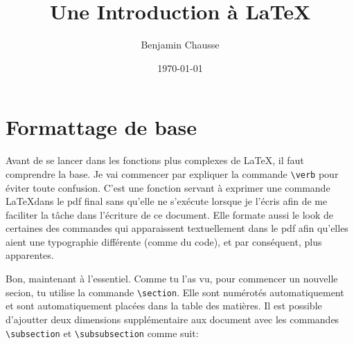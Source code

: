\documentclass[a4paper, 10pt]{article}
\title{Une Introduction à \LaTeX}
\author{Benjamin Chausse}
\date{\today}
\begin{document}
\maketitle


\newpage

\tableofcontents

\newpage

\section{Formattage de base} Avant de se lancer dans les fonctions plus
complexes de \LaTeX, il faut comprendre la base. Je vai commencer par expliquer
la commande \verb+\verb+ pour éviter toute confusion. C'est une fonction
servant à exprimer une commande \LaTeX dans le pdf final sans qu'elle ne
s'exécute lorsque je l'écris afin de me faciliter la tâche dans l'écriture de
ce document. Elle formate aussi le look de certaines des commandes qui
apparaissent textuellement dans le pdf afin qu'elles aient une typographie
différente (comme du code), et par conséquent, plus apparentes.

Bon, maintenant à l'essentiel. Comme tu l'as vu, pour commencer un nouvelle
secion, tu utilise la commande \verb+\section+. Elle sont numérotés
automatiquement et sont automatiquement placées dans la table des matières.
Il est possible d'ajoutter deux dimensions supplémentaire aux document avec
les commandes \verb+\subsection+ et \verb+\subsubsection+ comme suit:
\end{document}
